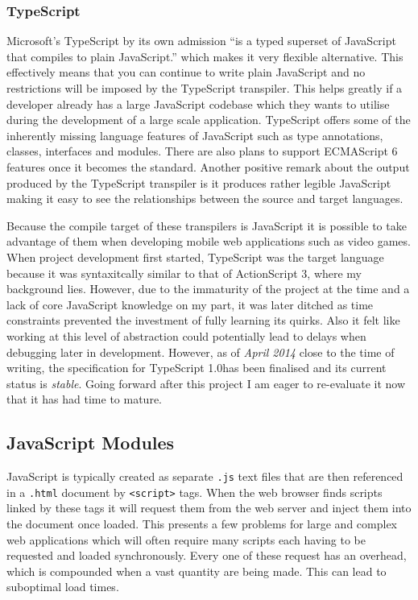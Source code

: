 \documentclass[final]{cmpreport}
\begin{document}
\subsubsection{TypeScript}
Microsoft's TypeScript by its own admission ``is a typed superset of JavaScript that compiles to plain JavaScript.'' which makes it very flexible alternative. This effectively means that you can continue to write plain JavaScript and no restrictions will be imposed by the TypeScript transpiler. This helps greatly if a developer already has a large JavaScript codebase which they wants to utilise during the development of a large scale application. TypeScript offers some of the inherently missing language features of JavaScript such as type annotations, classes, interfaces and modules. There are also plans to support ECMAScript 6 features once it becomes the standard. Another positive remark about the output produced by the TypeScript transpiler is it produces rather legible JavaScript making it easy to see the relationships between the source and target languages.

Because the compile target of these transpilers is JavaScript it is possible to take advantage of them when developing mobile web applications such as video games. When project development first started, TypeScript was the target language because it was syntaxitcally similar to that of ActionScript 3, where my background lies. However, due to the immaturity of the project at the time and a lack of core JavaScript knowledge on my part, it was later ditched as time constraints prevented the investment of fully learning its quirks. Also it felt like working at this level of abstraction could potentially lead to delays when debugging later in development. However, as of \textit{April 2014} close to the time of writing, the specification for TypeScript 1.0\footnotemark has been finalised and its current status is \textit{stable}. Going forward after this project I am eager to re-evaluate it now that it has had time to mature.


\subsection{JavaScript Modules}
JavaScript is typically created as separate \texttt{.js} text files that are then referenced in a \texttt{.html} document by \texttt{<script>} tags. When the web browser finds scripts linked by these tags it will request them from the web server and inject them into the document once loaded. This presents a few problems for large and complex web applications which will often require many scripts each having to be requested and loaded synchronously. Every one of these request has an overhead, which is compounded when a vast quantity are being made. This can lead to suboptimal load times.
\end{document}
